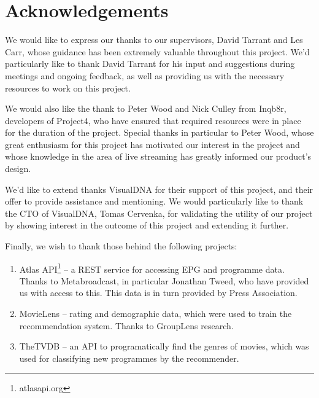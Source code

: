 \section{Acknowledgements}

We would like to express our thanks to our supervisors, David Tarrant and Les Carr, whose guidance has been extremely valuable throughout this project. We'd particularly like to thank David Tarrant for his input and suggestions during meetings and ongoing feedback, as well as providing us with the necessary resources to work on this project.

We would also like the thank to Peter Wood and Nick Culley from Inqb8r, developers of Project4, who have ensured that required resources were in place for the duration of the project. Special thanks in particular to Peter Wood, whose great enthusiasm for this project has motivated our interest in the project and whose knowledge in the area of live streaming has greatly informed our product's design.

We'd like to extend thanks VisualDNA for their support of this project, and their offer to provide assistance and mentioning. We would particularly like to thank the CTO of VisualDNA, Tomas Cervenka, for validating the utility of our project by showing interest in the outcome of this project and extending it further.

Finally, we wish to thank those behind the following projects:
\begin{enumerate}
\item Atlas API\footnote{atlasapi.org} -- a REST service for accessing EPG and programme data. Thanks to Metabroadcast, in particular Jonathan Tweed, who have provided us with access to this. This data is in turn provided by Press Association.
\item MovieLens -- rating and demographic data, which were used to train the recommendation system. Thanks to GroupLens research.
\item TheTVDB -- an API to programatically find the genres of movies, which was used for classifying new programmes by the recommender.
\end{enumerate}

\cleardoublepage
\setcounter{tocdepth}{2}

\begin{comment}
	\tableofcontents
	\newpage
	\cleardoublepage
	\setcounter{page}{0}
	\pagenumbering{arabic}
	\cleardoublepage
\end{comment}

